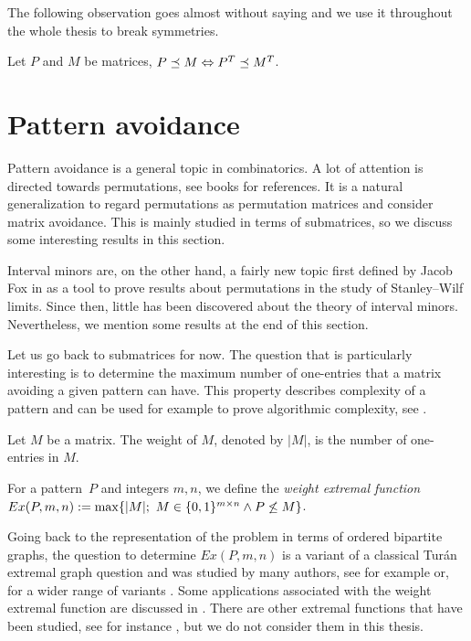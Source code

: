The following observation goes almost without saying and we use it throughout the whole thesis to break symmetries.

\begin{obs}
Let $P$ and $M$ be matrices, $P\preceq M\Leftrightarrow P^T\preceq M^T$.
\end{obs}

\section{Pattern avoidance}
Pattern avoidance is a general topic in combinatorics. A lot of attention is directed towards permutations, see books \cite{bona, kitaev} for references. It is a natural generalization to regard permutations as permutation matrices and consider matrix avoidance. This is mainly studied in terms of submatrices, so we discuss some interesting results in this section.

Interval minors are, on the other hand, a fairly new topic first defined by Jacob Fox in \cite{fox} as a tool to prove results about permutations in the study of Stanley--Wilf limits. Since then, little has been discovered about the theory of interval minors. Nevertheless, we mention some results at the end of this section.

Let us go back to submatrices for now. The question that is particularly interesting is to determine the maximum number of one-entries that a matrix avoiding a given pattern can have. This property describes complexity of a pattern and can be used for example to prove algorithmic complexity, see \cite{efrat}.

\begin{defn}
Let $M$ be a matrix. The weight of $M$, denoted by $|M|$, is the number of one-entries in $M$.
\end{defn}

\begin{defn}
For a pattern~$P$ and integers $m,n$, we define the \emph{weight extremal function}~$Ex(P,m,n):=\max\{|M|;\ M\in\Mat\wedge\PnsmM\}$.
\end{defn}

Going back to the representation of the problem in terms of ordered bipartite graphs, the question to determine $Ex(P,m,n)$ is a variant of a classical Tur{\'a}n extremal graph question and was studied by many authors, see for example \cite{tardos, furedi} or, for a wider range of variants \cite{brass, claesson, klazar, pach}. Some applications associated with the weight extremal function are discussed in \cite{fulek}. There are other extremal functions that have been studied, see for instance \cite{kyncl}, but we do not consider them in this thesis.

